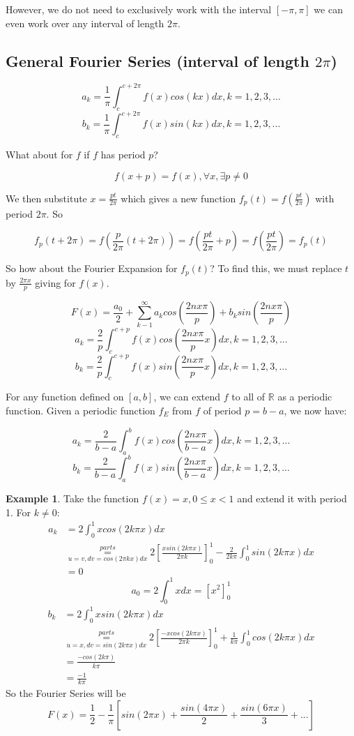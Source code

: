 \documentclass[12pt]{article}
\theoremstyle{plain}
\theoremstyle{definition}
\newtheorem{example}[theorem]{Example}
\begin{document}
However, we do not need to exclusively work with the interval $[-\pi, \pi]$ we can even work over any interval of length $2\pi$.

\subsection{General Fourier Series (interval of length $2\pi$)}

$$a_k = \frac{1}{\pi} \int^{c+2\pi}_{c} f(x) cos(kx) dx, k=1,2,3,...$$
$$b_k = \frac{1}{\pi} \int^{c+2\pi}_{c} f(x) sin(kx) dx, k=1,2,3,...$$

What about for $f$ if $f$ has period $p$?

$$f(x+p) = f(x), \forall x, \exists p \neq 0$$

We then substitute $x = \frac{pt}{2\pi}$ which gives a new function $f_p (t) = f(\frac{pt}{2\pi})$ with period $2\pi$. So

$$f_p (t+2\pi) = f(\frac{p}{2\pi} (t+2\pi)) = f(\frac{pt}{2\pi} + p) = f(\frac{pt}{2\pi}) = f_p (t)$$

So how about the Fourier Expansion for $f_p (t)$? To find this, we must replace $t$ by $\frac{2\pi x}{p}$ giving for $f(x)$.

$$F(x) = \frac{a_0}{2}+ \sum^\infty_{k-1} a_k cos(\frac{2nx\pi}{p}) + b_k sin(\frac{2nx\pi}{p})$$
$$a_k = \frac{2}{p} \int^{c+p}_{c} f(x) cos(\frac{2nx\pi}{p}x) dx, k=1,2,3,...$$
$$b_k = \frac{2}{p} \int^{c+p}_{c} f(x) sin(\frac{2nx\pi}{p}x) dx, k=1,2,3,...$$

For any function defined on $[a,b]$, we can extend $f$ to all of $\mathbb{R}$ as a periodic function. Given a periodic function $f_E$ from $f$ of period $p=b-a$, we now have:

$$a_k = \frac{2}{b-a} \int^{b}_{a} f(x) cos(\frac{2nx\pi}{b-a}x) dx, k=1,2,3,...$$
$$b_k = \frac{2}{b-a} \int^{b}_{a} f(x) sin(\frac{2nx\pi}{b-a}x) dx, k=1,2,3,...$$

\begin{example}
    Take the function $f(x) = x, 0\leq x < 1$ and extend it with period 1. For $k\neq 0$:
    \begin{align*}
        a_k &= 2 \int^{1}_{0} xcos(2k\pi x) dx\\
        &\overset{parts}{\underset{u=v, dv=cos(2\pi kx)dx}{=}} 2[\frac{xsin(2k\pi x)}{2\pi k}]^1_0 - \frac{2}{2k \pi} \int^1_0 sin(2k\pi x) dx\\
        &=0
    \end{align*}
    $$a_0 = 2 \int^1_0 x dx = [x^2 ]^1_0$$
    \begin{align*}
        b_k &= 2\int^1_0 x sin(2k\pi x)dx\\
        &\underset{u=x, dv=sin(2k\pi x)dx}{\overset{parts}{=}} 2[\frac{-xcos(2k\pi x)}{2\pi k}]^1_0 + \frac{1}{k\pi} \int^1_0 cos(2k\pi x)dx\\
        &= \frac{-cos(2k\pi)}{k\pi}\\
        &= \frac{-1}{k\pi}
    \end{align*}
    So the Fourier Series will be
    $$F(x) = \frac{1}{2} - \frac{1}{\pi} [sin(2\pi x) + \frac{sin(4\pi x)}{2} + \frac{sin(6\pi x)}{3} + ...]$$
\end{example}
\end{document}
